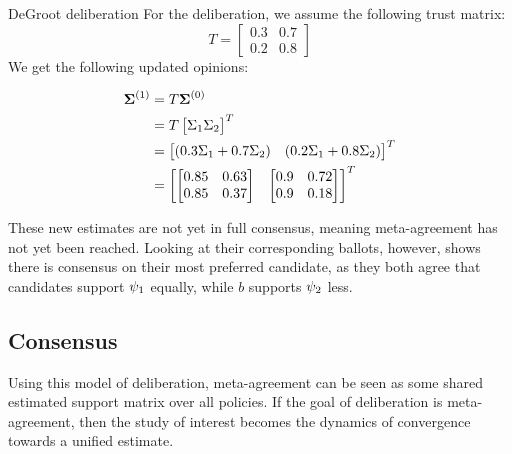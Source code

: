 \begin{example}{DeGroot deliberation} {}
	For the deliberation, we assume the following trust matrix:
	\[
		T= \begin{bmatrix}
			0.3 & 0.7 \\
			0.2 & 0.8
		\end{bmatrix}
	\]
	We get the following updated opinions:

	\begin{align*}
		\boldsymbol{\boldsymbol{\Sigma}}^{(1)}
		 & =
		T\boldsymbol{\boldsymbol{\Sigma}}^{(0)}
		\\ &
		=T\begin{bmatrix}\Sigma_1
			  \Sigma_2\end{bmatrix}^{T}
		\\ &
		=\begin{bmatrix}(0.3\Sigma_1
			 + 0.7\Sigma_{2}) &
			 (0.2\Sigma_1 +
			 0.8\Sigma_{2})\end{bmatrix}^{T} \\
		 & = \begin{bmatrix}
			     \begin{bmatrix}
				0.85 & 0.63
				\\
				0.85 & 0.37\end{bmatrix}
			      &
			     \begin{bmatrix}
				0.9 & 0.72
				\\ 0.9 & 0.18 \\
			\end{bmatrix}
		     \end{bmatrix}^{T}
	\end{align*}

	These new estimates are not yet in full consensus, meaning meta-agreement has not yet been reached.  Looking at their
	corresponding ballots, however, shows there is consensus on their most preferred candidate,
	as they both agree that candidates support $\psi_1$ equally, while $b$
	supports $\psi_2$ less.

	\label{example:deGroot-delib}
\end{example}


\subsection{Consensus} \label{sub: concensus DeGroot}


Using this model of deliberation, meta-agreement can be seen as some shared estimated
support matrix over all policies. If the goal of deliberation is
meta-agreement, then the study of interest becomes the dynamics of convergence
towards a unified estimate.

